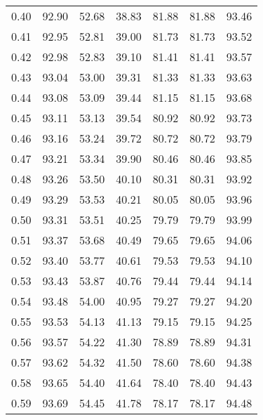 \begin{tabular}{|c|c|c|c|c|c|c|}
      0.40 &     92.90 &     52.68 &      38.83 &   81.88 &      81.88 &         93.46 \\
      0.41 &     92.95 &     52.81 &      39.00 &   81.73 &      81.73 &         93.52 \\
      0.42 &     92.98 &     52.83 &      39.10 &   81.41 &      81.41 &         93.57 \\
      0.43 &     93.04 &     53.00 &      39.31 &   81.33 &      81.33 &         93.63 \\
      0.44 &     93.08 &     53.09 &      39.44 &   81.15 &      81.15 &         93.68 \\
      0.45 &     93.11 &     53.13 &      39.54 &   80.92 &      80.92 &         93.73 \\
      0.46 &     93.16 &     53.24 &      39.72 &   80.72 &      80.72 &         93.79 \\
      0.47 &     93.21 &     53.34 &      39.90 &   80.46 &      80.46 &         93.85 \\
      0.48 &     93.26 &     53.50 &      40.10 &   80.31 &      80.31 &         93.92 \\
      0.49 &     93.29 &     53.53 &      40.21 &   80.05 &      80.05 &         93.96 \\
      0.50 &     93.31 &     53.51 &      40.25 &   79.79 &      79.79 &         93.99 \\
      0.51 &     93.37 &     53.68 &      40.49 &   79.65 &      79.65 &         94.06 \\
      0.52 &     93.40 &     53.77 &      40.61 &   79.53 &      79.53 &         94.10 \\
      0.53 &     93.43 &     53.87 &      40.76 &   79.44 &      79.44 &         94.14 \\
      0.54 &     93.48 &     54.00 &      40.95 &   79.27 &      79.27 &         94.20 \\
      0.55 &     93.53 &     54.13 &      41.13 &   79.15 &      79.15 &         94.25 \\
      0.56 &     93.57 &     54.22 &      41.30 &   78.89 &      78.89 &         94.31 \\
      0.57 &     93.62 &     54.32 &      41.50 &   78.60 &      78.60 &         94.38 \\
      0.58 &     93.65 &     54.40 &      41.64 &   78.40 &      78.40 &         94.43 \\
      0.59 &     93.69 &     54.45 &      41.78 &   78.17 &      78.17 &         94.48 \\

\end{tabular}
